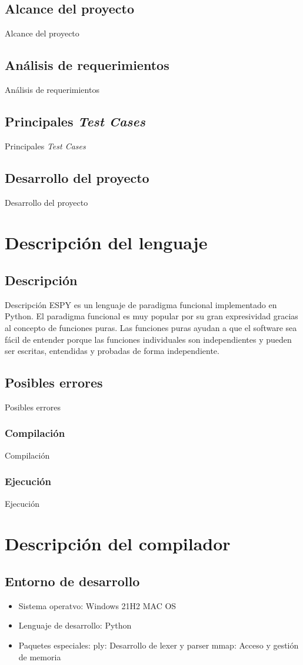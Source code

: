 \documentclass[12pt,letterpaper, titlepage, onecolumn]{article}
\begin{document}
	\subsection{Alcance del proyecto}
	Alcance del proyecto
	\subsection{Análisis de requerimientos}
	Análisis de requerimientos
	\subsection{Principales \textsl{Test Cases}}
	Principales \textsl{Test Cases}
	\subsection{Desarrollo del proyecto}
	Desarrollo del proyecto

\section{Descripción del lenguaje}
	\subsection{Descripción}
	Descripción
	ESPY es un lenguaje de paradigma funcional implementado en Python. 
	El paradigma funcional es muy popular por su gran expresividad gracias al concepto de 
	funciones puras. Las funciones puras ayudan a que el software sea fácil de entender porque 
	las funciones individuales son independientes y pueden ser escritas, entendidas y probadas 
	de forma independiente.
	\subsection{Posibles errores}
	Posibles errores
	\subsubsection{Compilación}
	Compilación
	\subsubsection{Ejecución}
	Ejecución

\section{Descripción del compilador}
	\subsection{Entorno de desarrollo}
		\begin{itemize}
			\item Sistema operatvo: 
				\subitem Windows 21H2
				\subitem MAC OS
			\item Lenguaje de desarrollo: 
				\subitem Python
			\item Paquetes especiales:
				\subitem ply: Desarrollo de lexer y parser
				\subitem mmap: Acceso y gestión de memoria
		\end{itemize}
\end{document}
